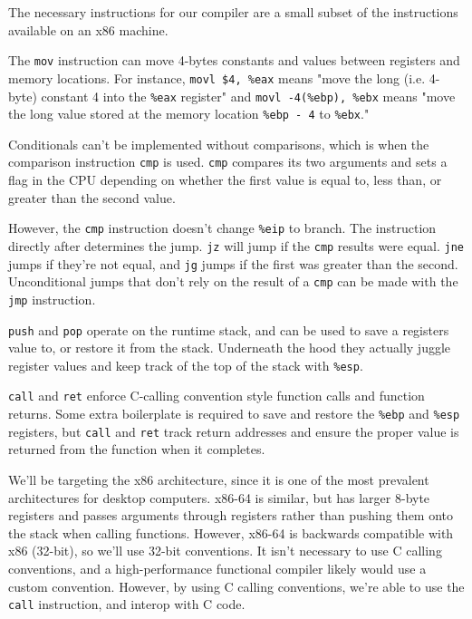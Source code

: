 \documentclass{book}
\newcommand{\Scribtexttt}[1]{{\texttt{#1}}}
\begin{document}
The necessary instructions for our compiler are a small subset of the
instructions available on an x86 machine.

The \Scribtexttt{mov} instruction can move 4{-}bytes constants and values between
registers and memory locations. For instance, \Scribtexttt{movl \$4, \%eax} means
"move the long (i.e. 4{-}byte) constant 4 into the \Scribtexttt{\%eax} register" and
\Scribtexttt{movl {-}4(\%ebp), \%ebx} means "move the long value stored at the memory
location \Scribtexttt{\%ebp {-} 4} to \Scribtexttt{\%ebx}."

Conditionals can{'}t be implemented without comparisons, which is when the
comparison instruction \Scribtexttt{cmp} is used. \Scribtexttt{cmp} compares its two
arguments and sets a flag in the CPU depending on whether the first value
is equal to, less than, or greater than the second value.

However, the \Scribtexttt{cmp} instruction doesn{'}t change \Scribtexttt{\%eip} to branch. The
instruction directly after determines the jump. \Scribtexttt{jz} will jump if the
\Scribtexttt{cmp} results were equal. \Scribtexttt{jne} jumps if they{'}re not equal, and
\Scribtexttt{jg} jumps if the first was greater than the second. Unconditional
jumps that don{'}t rely on the result of a \Scribtexttt{cmp} can be made with the
\Scribtexttt{jmp} instruction.

\Scribtexttt{push} and \Scribtexttt{pop} operate on the runtime stack, and can be used to
save a registers value to, or restore it from the stack. Underneath the
hood they actually juggle register values and keep track of the top of the
stack with \Scribtexttt{\%esp}.

\Scribtexttt{call} and \Scribtexttt{ret} enforce C{-}calling convention style function calls
and function returns. Some extra boilerplate is required to save and
restore the \Scribtexttt{\%ebp} and \Scribtexttt{\%esp} registers, but \Scribtexttt{call} and \Scribtexttt{ret}
track return addresses and ensure the proper value is returned from the
function when it completes.

We{'}ll be targeting the x86 architecture, since it is one of the most
prevalent architectures for desktop computers. x86{-}64 is similar, but has
larger 8{-}byte registers and passes arguments through registers rather than
pushing them onto the stack when calling functions. However, x86{-}64 is
backwards compatible with x86 (32{-}bit), so we{'}ll use 32{-}bit conventions.
It isn{'}t necessary to use C calling conventions, and a high{-}performance
functional compiler likely would use a custom convention. However, by
using C calling conventions, we{'}re able to use the \Scribtexttt{call} instruction,
and interop with C code.
\end{document}

